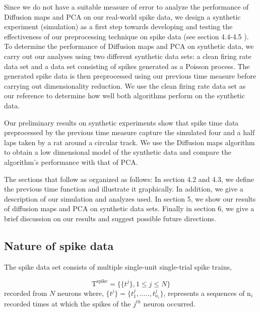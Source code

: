 Since we do not have a suitable measure of error to analyze the performance of Diffusion maps and PCA on our
real-world spike data, we design a synthetic experiment (simulation)  as a first step towards  developing and testing the effectiveness of our preprocessing technique on spike data (see section 4.4-4.5 ).
To determine the performance of Diffusion maps and PCA on synthetic data, we carry out  our analyses  using two different synthetic data sets:  a clean firing rate data set and a data set consisting of spikes generated as a Poisson process.
The generated spike data is then preprocessed using our previous time measure before carrying out dimensionality reduction. We use the clean firing rate data set as our reference to determine how well both algorithms perform
on the  synthetic data.


Our preliminary results on synthetic experiments show that spike time data preprocessed by the previous time measure
capture the simulated four and a half laps taken by a rat around a circular track. We use the Diffusion maps algorithm 
to obtain a low dimensional model of the synthetic data and compare the algorithm's performance with that of PCA.


The sections that follow as organized as follows: In section  4.2 and 4.3,  we define the previous time function and illustrate it graphically.  In addition, we give a description of our simulation and analyzes used. In section 5, we show our results of diffusion maps and PCA on synthetic data sets. Finally in section 6, we give a brief discussion on our results and suggest possible future directions.

\subsection{Nature of spike  data}
The  spike  data  set consists  of multiple single-unit single-trial spike trains,

\[ 
\text{T}^{\text{spike}} = \displaystyle \{ \{ t^{j} \} ,  1 \leq j \leq N \}  
\]
recorded from $N$  neurons  where,
$\displaystyle  \{t^{j}\} =  \{t_{1}^{j}, ....., t_{n_{i}}^{j} \} $, represents  a sequences of n$_{i}$ recorded times at which the spikes of the $j^{th}$ neuron occurred. 

 

